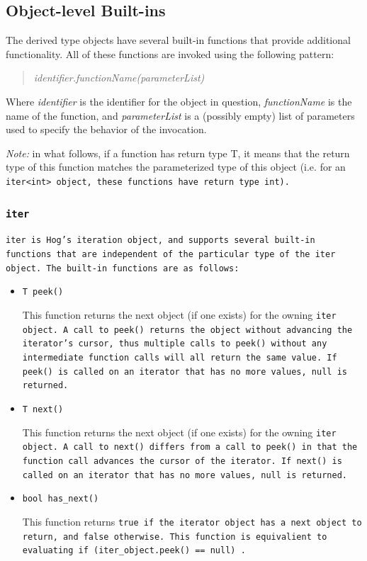 \documentclass{article}
\begin{document}

\subsection{Object-level Built-ins} %
\label{sub:object_level_built_ins}

The derived type objects have several built-in functions that provide additional functionality. All of these functions
are invoked using the following pattern:

\begin{quotation}
\emph{identifier.functionName(parameterList)}
\end{quotation}

\noindent Where \emph{identifier} is the identifier for the object in question, \emph{functionName} is the name of the
function, and \emph{parameterList} is a (possibly empty) list of parameters used to specify the behavior of the invocation.

\emph{Note:} in what follows, if a function has return type T, it means that the return type of this function matches the
parameterized type of this object (i.e. for an \tt iter<int> \rm object, these functions have return type \tt int\rm).

\subsubsection{\tt iter \rm} %
\label{ssub:iter}

\tt iter \rm is Hog's iteration object, and supports several built-in functions
that are independent of the particular type of the \tt iter \rm object. The built-in functions are as follows:

\begin{itemize}

\item[] \tt T peek() \rm

This function returns the next object (if one exists) for the owning \tt iter \rm
object. A call to \tt peek() \rm returns the object without advancing the iterator's
cursor, thus multiple calls to \tt peek() \rm without any intermediate function calls
will all return the same value. If \tt peek() \rm is called on an iterator that has
no more values, \tt null \rm is returned. 

\item[] \tt T next() \rm

This function returns the next object (if one exists) for the owning \tt iter \rm
object. A call to \tt next() \rm differs from a call to \tt peek() \rm in that the
function call advances the cursor of the iterator. If \tt next() \rm is called on
an iterator that has no more values, \tt null \rm is returned. 

\item[] \tt bool has\_next() \rm

This function returns \tt true \rm if the iterator object has a next object
to return, and \tt false \rm otherwise. This function is equivalient to evaluating
\tt if (iter\_object.peek() == null) \rm.

\end{itemize} 
\end{document}
